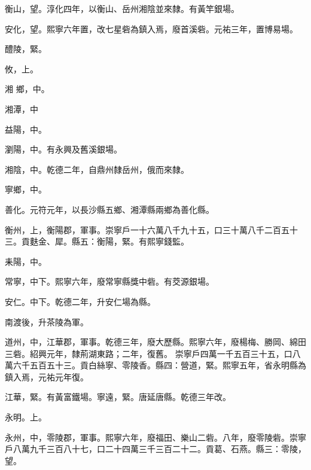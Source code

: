 \begin{pinyinscope}
 衡山，望。淳化四年，以衡山、岳州湘陰並來隸。有黃竿銀場。



 安化，望。熙寧六年置，改七星砦為鎮入焉，廢首溪砦。元祐三年，置博易場。



 醴陵，緊。



 攸，上。



 湘
 鄉，中。



 湘潭，中



 益陽，中。



 瀏陽，中。有永興及舊溪銀場。



 湘陰，中。乾德二年，自鼎州隸岳州，俄而來隸。



 寧鄉，中。



 善化。元符元年，以長沙縣五鄉、湘潭縣兩鄉為善化縣。



 衡州，上，衡陽郡，軍事。崇寧戶一十六萬八千九十五，口三十萬八千二百五十三。貢麩金、犀。縣五：衡陽，緊。有熙寧錢監。



 耒陽，中。



 常寧，中下。熙寧六年，廢常寧縣獎中砦。有茭源銀場。



 安仁。中下。乾德二年，升安仁場為縣。



 南渡後，升茶陵為軍。



 道州，中，江華郡，軍事。乾德三年，廢大歷縣。熙寧六年，廢楊梅、勝岡、綿田三砦。紹興元年，隸荊湖東路；二年，復舊。
 崇寧戶四萬一千五百三十五，口八萬六千五百五十三。貢白絲寧、零陵香。縣四：營道，緊。熙寧五年，省永明縣為鎮入焉，元祐元年復。



 江華，緊。有黃富鐵場。寧遠，緊。唐延唐縣。乾德三年改。



 永明。上。



 永州，中，零陵郡，軍事。熙寧六年，廢福田、樂山二砦。八年，廢零陵砦。崇寧戶八萬九千三百八十七，口二十四萬三千三百二十二。貢葛、石燕。縣三：零陵，望。




\end{pinyinscope}
